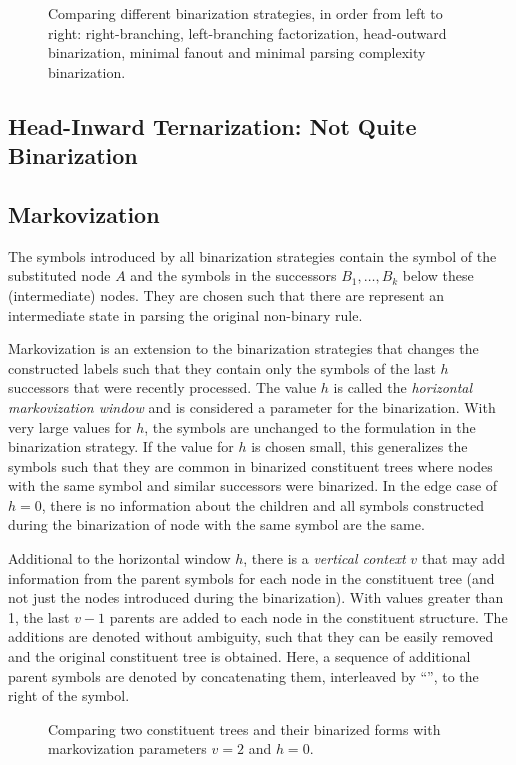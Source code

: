 \documentclass[../../document.tex]{subfiles}
\begin{document}
    \begin{figure}
        \caption{\label{fig:ex:binarization}
            Comparing different binarization strategies, in order from left to right: right-branching, left-branching factorization, head-outward binarization, minimal fanout and minimal parsing complexity binarization.}
    \end{figure}

    \subsection{Head-Inward Ternarization: Not Quite Binarization} \label{sec:extraction:bin:hi}


    \subsection{Markovization}
    The symbols introduced by all binarization strategies contain the symbol of the substituted node \(A\) and the symbols in the successors \(B_1, \ldots, B_k\) below these (intermediate) nodes.
    They are chosen such that there are represent an intermediate state in parsing the original non-binary rule.

    Markovization is an extension to the binarization strategies that changes the constructed labels such that they contain only the symbols of the last \(h\) successors that were recently processed.
    The value \(h\) is called the \emph{horizontal markovization window} and is considered a parameter for the binarization.
    With very large values for \(h\), the symbols are unchanged to the formulation in the binarization strategy.
    If the value for \(h\) is chosen small, this generalizes the symbols such that they are common in binarized constituent trees where nodes with the same symbol and similar successors were binarized.
    In the edge case of \(h=0\), there is no information about the children and all symbols constructed during the binarization of node with the same symbol are the same.

    Additional to the horizontal window \(h\), there is a \emph{vertical context} \(v\) that may add information from the parent symbols for each node in the constituent tree (and not just the nodes introduced during the binarization).
    With values greater than 1, the last \(v-1\) parents are added to each node in the constituent structure.
    The additions are denoted without ambiguity, such that they can be easily removed and the original constituent tree is obtained.
    Here, a sequence of additional parent symbols are denoted by concatenating them, interleaved by ``\cn{$\wedge$}'', to the right of the symbol.

    \begin{figure}
        \caption{\label{fig:ex:markovization}
            Comparing two constituent trees and their binarized forms with markovization parameters \(v=2\) and \(h=0\).}
    \end{figure}
\end{document}
